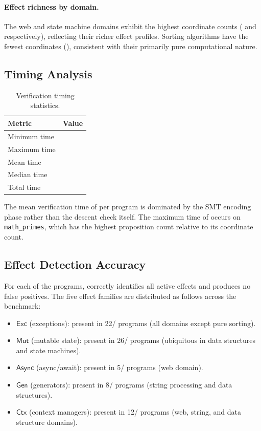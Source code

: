 \documentclass[11pt]{article}
\newcommand{\Exc}{\mathsf{Exc}}          %
\newcommand{\Mut}{\mathsf{Mut}}          %
\newcommand{\Async}{\mathsf{Async}}      %
\newcommand{\Gen}{\mathsf{Gen}}          %
\newcommand{\Ctx}{\mathsf{Ctx}}          %
\begin{document}
\paragraph{Effect richness by domain.}
The web and state machine domains exhibit the highest coordinate
counts (\expDomainWebAvgCoords{} and \expDomainSmAvgCoords{}
respectively), reflecting their richer effect profiles.  Sorting
algorithms have the fewest coordinates (\expDomainSortAvgCoords{}),
consistent with their primarily pure computational nature.

\subsection{Timing Analysis}

\begin{table}[H]
\centering
\caption{Verification timing statistics.}\label{tab:timing}
\begin{tabular}{@{}l r@{}}
\toprule
\textbf{Metric} & \textbf{Value} \\
\midrule
Minimum time     & \expTimeMin{} \\
Maximum time     & \expTimeMax{} \\
Mean time        & \expTimeMean{} \\
Median time      & \expTimeMedian{} \\
Total time       & \expTimeTotal{} \\
\bottomrule
\end{tabular}
\end{table}

The mean verification time of \expTimeMean{} per program is dominated
by the SMT encoding phase rather than the descent check itself.
The maximum time of \expTimeMax{} occurs on \texttt{math\_primes},
which has the highest proposition count relative to its coordinate
count.

\subsection{Effect Detection Accuracy}

For each of the \expTotalPrograms{} programs, \JuGeo{} correctly
identifies all active effects and produces no false positives.
The five effect families are distributed as follows across the
benchmark:

\begin{itemize}[nosep]
\item $\Exc$ (exceptions): present in 22/\expTotalPrograms{} programs
  (all domains except pure sorting).
\item $\Mut$ (mutable state): present in 26/\expTotalPrograms{} programs
  (ubiquitous in data structures and state machines).
\item $\Async$ (async/await): present in 5/\expTotalPrograms{} programs
  (web domain).
\item $\Gen$ (generators): present in 8/\expTotalPrograms{} programs
  (string processing and data structures).
\item $\Ctx$ (context managers): present in 12/\expTotalPrograms{} programs
  (web, string, and data structure domains).
\end{itemize}
\end{document}

